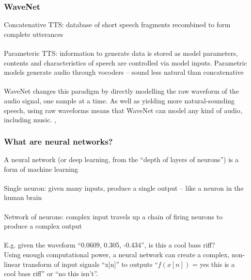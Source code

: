 \documentclass{beamer}
\begin{document}

\begin{frame}
	\frametitle{WaveNet}
	Concatenative TTS: database of short speech fragments recombined to form complete utterances\\\ \\

	Parameteric TTS: information to generate data is stored as model parameters, contents and characteristics of speech are controlled via model inputs. Parametric models generate audio through vocoders -- sound less natural than concatenative\\\ \\

	WaveNet changes this paradigm by directly modelling the raw waveform of the audio signal, one sample at a time. As well as yielding more natural-sounding speech, using raw waveforms means that WaveNet can model any kind of audio, including music. , 
\end{frame}


\begin{frame}
	\frametitle{What are neural networks?}
	A neural network (or deep learning, from the ``depth of layers of neurons'') is a form of machine learning\\\ \\
	Single neuron: given many inputs, produce a single output -- like a neuron in the human brain\\\ \\
	Network of neurons: complex input travels up a chain of firing neurons to produce a complex output\\\ \\
	E.g. given the waveform ``0.0609, 0.305, -0.434'', is this a cool bass riff?\\
	Using enough computational power, a neural network can create a complex, non-linear transform of input signals ``x[n]'' to outputs ``$f(x[n])$ = yes this is a cool bass riff'' or ``no this isn't''.
\end{frame}
\end{document}
